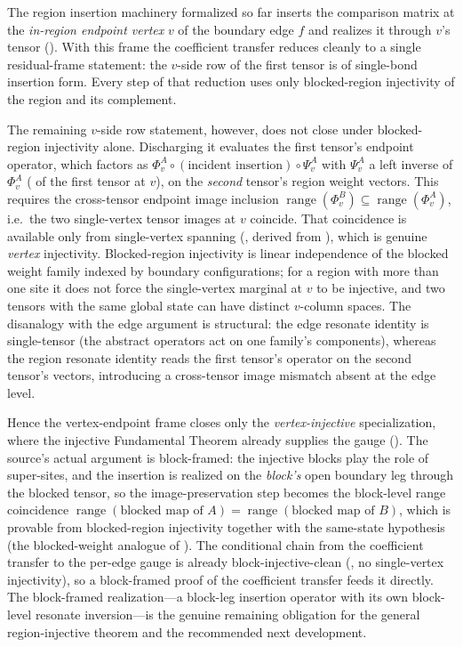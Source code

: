 \documentclass{article}
\begin{document}
The region insertion machinery formalized so far inserts the comparison matrix
at the \emph{in-region endpoint vertex} $v$ of the boundary edge $f$ and
realizes it through $v$'s tensor (). With this frame the
coefficient transfer reduces cleanly to a single residual-frame statement: the
$v$-side row of the first tensor is of single-bond insertion form. Every step of
that reduction uses only blocked-region injectivity of the region and its
complement.

The remaining $v$-side row statement, however, does not close under blocked-region
injectivity alone. Discharging it evaluates the first tensor's endpoint operator,
which factors as
$\Phi^A_v \circ (\text{incident insertion}) \circ \Psi^A_v$ with $\Psi^A_v$ a left
inverse of $\Phi^A_v$ ( of the first tensor at $v$), on the \emph{second} tensor's
region weight vectors. This requires the cross-tensor endpoint image inclusion
$\operatorname{range}(\Phi^B_v)\subseteq\operatorname{range}(\Phi^A_v)$, i.e.\ the
two single-vertex tensor images at $v$ coincide. That coincidence is available only
from single-vertex spanning (, derived from
), which is genuine
\emph{vertex} injectivity. Blocked-region injectivity is linear independence of the
blocked weight family indexed by boundary configurations; for a region with more
than one site it does not force the single-vertex marginal at $v$ to be injective,
and two tensors with the same global state can have distinct $v$-column spaces. The
disanalogy with the edge argument is structural: the edge resonate identity is
single-tensor (the abstract operators act on one family's components), whereas the
region resonate identity reads the first tensor's operator on the second tensor's
vectors, introducing a cross-tensor image mismatch absent at the edge level.

Hence the vertex-endpoint frame closes only the \emph{vertex-injective}
specialization, where the injective Fundamental Theorem already supplies the gauge
(). The source's actual
argument is block-framed: the injective blocks play the role of super-sites, and the
insertion is realized on the \emph{block's} open boundary leg through the blocked
tensor, so the image-preservation step becomes the block-level range coincidence
$\operatorname{range}(\text{blocked map of }A)=\operatorname{range}(\text{blocked map of }B)$,
which is provable from blocked-region injectivity together with the same-state
hypothesis (the blocked-weight analogue of
). The conditional chain from the
coefficient transfer to the per-edge gauge is already block-injective-clean
(, no single-vertex injectivity), so a
block-framed proof of the coefficient transfer feeds it directly. The block-framed
realization---a block-leg insertion operator with its own block-level resonate
inversion---is the genuine remaining obligation for the general region-injective
theorem and the recommended next development.
\end{document}
